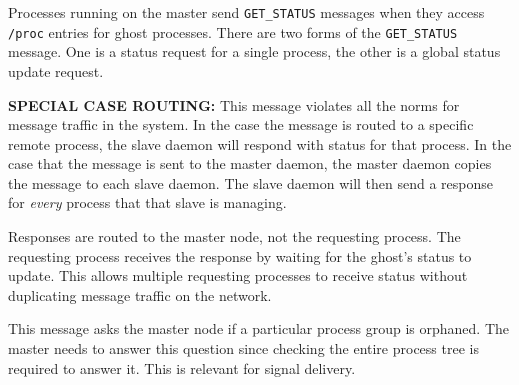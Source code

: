 \begin{description}
  \begin{reqresp}
  \noresponse
  \end{reqresp}


  Processes running on the master send \texttt{GET\_STATUS} messages
  when they access \texttt{/proc} entries for ghost processes.  There
  are two forms of the \texttt{GET\_STATUS} message.  One is a status
  request for a single process, the other is a global status update
  request.

  \textbf{SPECIAL CASE ROUTING:} This message violates all the norms
  for message traffic in the system.  In the case the message is
  routed to a specific remote process, the slave daemon will respond
  with status for that process.  In the case that the message is sent
  to the master daemon, the master daemon copies the message to each
  slave daemon.  The slave daemon will then send a response for
  \emph{every} process that that slave is managing.

  Responses are routed to the master node, not the requesting process.
  The requesting process receives the response by waiting for the
  ghost's status to update.  This allows multiple requesting processes
  to receive status without duplicating message traffic on the
  network.

  \begin{reqresp}
  \response
  \end{reqresp}


  This message asks the master node if a particular process group is
  orphaned.  The master needs to answer this question since checking
  the entire process tree is required to answer it.  This is relevant
  for signal delivery.

  \begin{reqresp}
  \response
  \end{reqresp}


\end{description}
